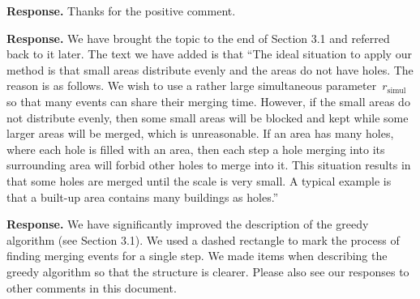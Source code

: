 \documentclass[a4paper,twoside,11pt]{reviewresponse}
\begin{document}
\textbf{Response.} Thanks for the positive comment.


\textbf{Response.} 
We have brought the topic to the end of Section 3.1
and referred back to it later.
The text we have added is that
``The ideal situation to apply our method is that 
small areas distribute evenly and the areas do not have holes.
The reason is as follows.
We wish to use a rather large simultaneous parameter~$r_\mathrm{simul}$
so that many events can share their merging time.
However, if the small areas do not distribute evenly,
then some small areas will be blocked and kept 
while some larger areas will be merged,
which is unreasonable.
If an area has many holes, where each hole is filled with an area, 
then each step a hole merging into its surrounding area will forbid
other holes to merge into it.
This situation results in that 
some holes are merged until the scale is very small.
A typical example is that 
a built-up area contains many buildings as holes.''





\textbf{Response.} 
We have significantly improved the description of the greedy algorithm
(see Section 3.1).
We used a dashed rectangle to mark the process of 
finding merging events for a single step.
We made items when describing the greedy algorithm
so that the structure is clearer.
Please also see our responses to other comments in this document.
\end{document}
